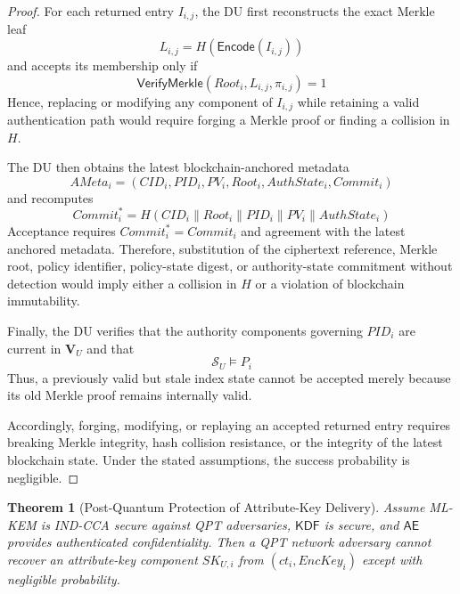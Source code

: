 \documentclass{ieeetj}
\theoremstyle{ieee-style}
\newtheorem{theorem}{Theorem}[subsection]
\begin{document}
\begin{proof}
For each returned entry $I_{i,j}$, the DU first reconstructs the exact
Merkle leaf
\begin{equation}
L_{i,j}=H(\mathsf{Encode}(I_{i,j}))
\end{equation}
and accepts its membership only if
\begin{equation}
\mathsf{VerifyMerkle}(Root_i,L_{i,j},\pi_{i,j})=1
\end{equation}
Hence, replacing or modifying any component of $I_{i,j}$ while retaining
a valid authentication path would require forging a Merkle proof or
finding a collision in $H$.

The DU then obtains the latest blockchain-anchored metadata
\begin{equation}
AMeta_i=
(CID_i,PID_i,PV_i,Root_i,AuthState_i,Commit_i)
\end{equation}
and recomputes
\begin{equation}
Commit_i^*
=
H(CID_i\parallel Root_i\parallel PID_i
\parallel PV_i\parallel AuthState_i)
\end{equation}
Acceptance requires $Commit_i^*=Commit_i$ and agreement with the latest
anchored metadata. Therefore, substitution of the ciphertext reference,
Merkle root, policy identifier, policy-state digest, or authority-state
commitment without detection would imply either a collision in $H$ or a
violation of blockchain immutability.

Finally, the DU verifies that the authority components governing
$PID_i$ are current in $\mathbf{V}_U$ and that
\begin{equation}
\mathcal{S}_U\models P_i
\end{equation}
Thus, a previously valid but stale index state cannot be accepted merely
because its old Merkle proof remains internally valid.

Accordingly, forging, modifying, or replaying an accepted returned entry
requires breaking Merkle integrity, hash collision resistance, or the
integrity of the latest blockchain state. Under the stated assumptions,
the success probability is negligible.
\end{proof}


\begin{theorem}[Post-Quantum Protection of Attribute-Key Delivery]
Assume ML-KEM is IND-CCA secure against QPT adversaries, $\mathsf{KDF}$
is secure, and $\mathsf{AE}$ provides authenticated confidentiality.
Then a QPT network adversary cannot recover an attribute-key component
$SK_{U,i}$ from $(ct_i,EncKey_i)$ except with negligible probability.
\end{theorem}
\end{document}
